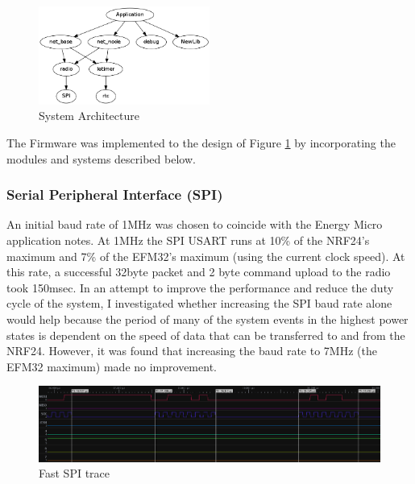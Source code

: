 \begin{figure}
  \vspace{-10pt}
  \begin{center}
    \includegraphics[width=0.5\textwidth, keepaspectratio=true]{images/modules_dep.png}
  \end{center}
  \caption[System Architecture]{System Architecture}
  \label{fig:imp_modules}
  \vspace{-10pt}
\end{figure}

The Firmware was implemented to the design of Figure \ref{fig:imp_modules} by incorporating the modules and systems
described below.

\subsubsection{Serial Peripheral Interface (SPI)}
An initial baud rate of 1MHz was chosen to coincide with the Energy Micro application notes. At
1MHz the \ac{SPI} \ac{USART} runs at 10\% of the NRF24's maximum and 7\% of the EFM32's maximum (using
the current clock speed). At this rate, a successful 32byte packet and 2 byte command upload to the
radio took 150msec. In an attempt to improve the performance and reduce the duty cycle of the
system, I investigated whether increasing the \ac{SPI} baud rate alone would help because the period of
many of the system events in the highest power states is dependent on the speed of data that can
be transferred to and from the \ac{NRF24}. However, it was found that increasing the baud rate to 7MHz
(the EFM32 maximum) made no improvement.

\begin{figure}[T]
  \begin{center}
    \includegraphics[width=1\textwidth, keepaspectratio=true]{images/digital_probe_fast_spi.png}
  \end{center}
  \caption[Fast SPI Trace]{Fast SPI trace}
  \label{fig:fast_spi}
\end{figure}

